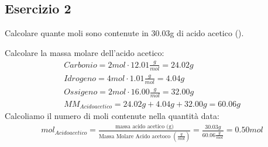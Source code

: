 \documentclass{book}
\begin{document}
\subsection{Esercizio 2}
\label{sec:esMolEnumDiMol2}
Calcolare quante moli sono contenute in 30.03g di acido acetico ().
\begin{tasks}
  \task Calcolare la massa molare dell'acido acetico:
  \begin{eqnarray*}
    Carbonio=2mol\cdot 12.01\frac{g}{mol}=24.02g\\
    Idrogeno=4mol\cdot 1.01\frac{g}{mol}=4.04g\\
    Ossigeno=2mol\cdot 16.00\frac{g}{mol}=32.00g\\
    MM_{Acido acetico}=24.02g+4.04g+32.00g=60.06g
  \end{eqnarray*}
  \task Calcoliamo il numero di moli contenute nella quantità data:
  \begin{eqnarray*}
    mol_{Acido acetico} = \frac{\text{massa acido acetico (g)}}{\text{Massa Molare Acido acetoco } \left(\frac{g}{mol}
    \right)} =\frac{30.03g}{60.06\frac{g}{mol}}=0.50mol
  \end{eqnarray*}
\end{tasks}
\end{document}
